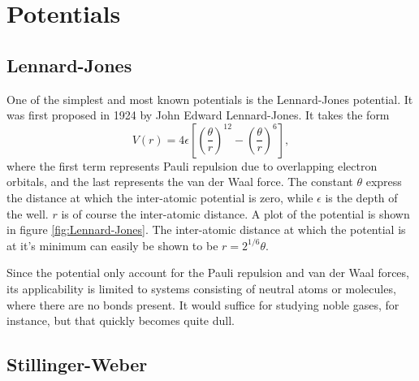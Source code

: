 \documentclass[twoside,english]{uiofysmaster}
\newcommand\lr[1]{\left(#1\right)}
\begin{document}
\section{Potentials}
\subsection{Lennard-Jones} \label{Lennard-Jones-section}
One of the simplest and most known potentials is the Lennard-Jones potential. It was first proposed in 1924 by John Edward Lennard-Jones.  It takes the form
\begin{equation}
	V(r) = 4\epsilon\left[\lr{\frac{\theta}{r}}^{12} -  \lr{\frac{\theta}{r}}^6 \right], \label{eq:Lennard-Jones}
\end{equation}
where the first term represents Pauli repulsion due to overlapping electron orbitals, and the last represents the van der Waal force. 
The constant $\theta$ express the distance at which the inter-atomic potential is zero, while $\epsilon$ is the depth of the well. 
$r$ is of course the inter-atomic distance. 
A plot of the potential is shown in figure \ref{fig:Lennard-Jones}.
The inter-atomic distance at which the potential is at it's minimum can easily be shown to be $r=2^{1/6}\theta$. 

\begin{figure}[H]
\end{figure}

Since the potential only account for the Pauli repulsion and van der Waal forces, its applicability is limited to systems consisting of neutral atoms or molecules, where there are no bonds present. It would suffice for studying noble gases, for instance, but that quickly becomes quite dull. 


 
\subsection{Stillinger-Weber}
\end{document}
